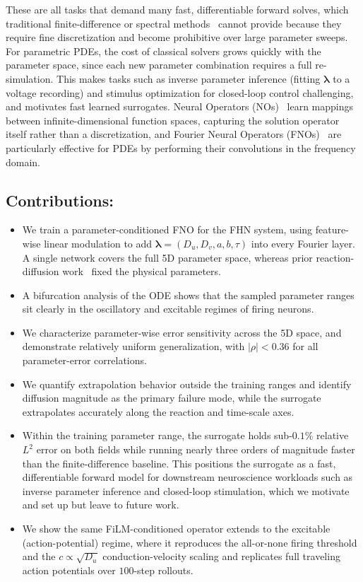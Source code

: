 \documentclass[runningheads]{llncs}
\begin{document}
These are all tasks that demand many fast, differentiable forward solves, which traditional finite-difference or spectral methods~\cite{Ermentrout2010,2020PhRvR...2b3068B} cannot provide because they require fine discretization and become prohibitive over large parameter sweeps. For parametric PDEs, the cost of classical solvers grows quickly with the parameter space, since each new parameter combination requires a full re-simulation. This makes tasks such as inverse parameter inference (fitting $\bm{\lambda}$ to a voltage recording) and stimulus optimization for closed-loop control challenging, and motivates fast learned surrogates. Neural Operators (NOs)~\cite{kovachki2021neural} learn mappings between infinite-dimensional function spaces, capturing the solution operator itself rather than a discretization, and Fourier Neural Operators (FNOs)~\cite{li2021fourierneuraloperatorparametric} are particularly effective for PDEs by performing their convolutions in the frequency domain.
%
\subsection*{Contributions:}
\begin{itemize}
    \item We train a parameter-conditioned FNO for the FHN system, using feature-wise linear modulation to add $\bm{\lambda} = (D_u, D_v, a, b, \tau)$ into every Fourier layer. A single network covers the full 5D parameter space, whereas prior reaction-diffusion work~\cite{hao2024fourier} fixed the physical parameters.
    \item A bifurcation analysis of the ODE shows that the sampled parameter ranges sit clearly in the oscillatory and excitable regimes of firing neurons.
    \item We characterize parameter-wise error sensitivity across the 5D space, and demonstrate relatively uniform generalization, with $|\rho| < 0.36$ for all parameter-error correlations.
    \item We quantify extrapolation behavior outside the training ranges and identify diffusion magnitude as the primary failure mode, while the surrogate extrapolates accurately along the reaction and time-scale axes.
    \item Within the training parameter range, the surrogate holds sub-$0.1\%$ relative $L^2$ error on both fields while running nearly three orders of magnitude faster than the finite-difference baseline. This positions the surrogate as a fast, differentiable forward model for downstream neuroscience workloads such as inverse parameter inference and closed-loop stimulation, which we motivate and set up but leave to future work.
    \item We show the same FiLM-conditioned operator extends to the excitable (action-potential) regime, where it reproduces the all-or-none firing threshold and the $c \propto \sqrt{D_u}$ conduction-velocity scaling and replicates full traveling action potentials over $100$-step rollouts.
\end{itemize}
\end{document}
